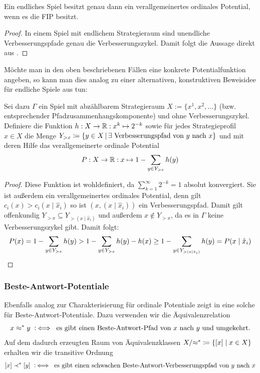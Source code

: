 \begin{kor}\label{kor:CharExVerOrdFIP}
	Ein endliches Spiel besitzt genau dann ein verallgemeinertes ordinales Potential, wenn es die FIP besitzt.
\end{kor}

\begin{proof}
	In einem Spiel mit endlichem Strategieraum sind unendliche Verbesserungspfade genau die Verbesserungszykel. Damit folgt die Aussage direkt aus .
\end{proof}

\begin{bem}
	Möchte man in den oben beschriebenen Fällen eine konkrete Potentialfunktion angeben, so kann man dies analog zu einer alternativen, konstruktiven Beweisidee für endliche Spiele aus \cite[Abschnitt 5]{CongGamesPlayerSpecPayoff} tun:

	Sei dazu $\Gamma$ ein Spiel mit abzählbarem Strategieraum $X := \{x^1, x^2, \dots \}$ (bzw. entsprechender Pfadzusammenhangskomponente) und ohne Verbesserungszykel. Definiere die Funktion $h: X \to \mathbb{R}: x^k \mapsto 2^{-k}$ sowie für jedes Strategieprofil $x \in X$ die Menge $Y_{>x} \coloneqq \left\{y \in X \,\middle|\, \exists \text{ Verbesserungspfad von } y \text{ nach } x\right\}$ und mit deren Hilfe das verallgemeinerte ordinale Potential
	\[P: X \to \mathbb{R}: x \mapsto 1 - \sum_{y \in Y_{>x}} h(y)\]
\end{bem}

\begin{proof}
	Diese Funktion ist wohldefiniert, da $\sum_{k=1}^{\infty} 2^{-k} = 1$ absolut konvergiert. Sie ist außerdem ein verallgemeinertes ordinales Potential, denn gilt $c_i(x) > c_i(x \mid \hat{x}_i)$ so ist $(x, (x \mid \hat{x}_i))$ ein Verbesserungspfad. Damit gilt offenkundig $Y_{>x} \subseteq Y_{>(x \mid \hat{x}_i)}$ und außerdem $x \notin Y_{>x}$, da es in $\Gamma$ keine Verbesserungszykel gibt. Damit folgt:
		\[P(x) = 1 - \sum_{y \in Y_{>x}} h(y) > 1 - \sum_{y \in Y_{>x}} h(y) - h(x) \geq 1 - \sum_{y \in Y_{>(x \mid \hat{x}_i)}}h(y) = P(x \mid \hat{x}_i)\qedhere\]
\end{proof}


\subsubsection{Beste-Antwort-Potentiale}

Ebenfalls analog zur Charakterisierung für ordinale Potentiale zeigt \citeauthor{BestRespPot} in \cite[Theorem 3.1]{BestRespPot} eine solche für Beste-Antwort-Potentiale. Dazu verwenden wir die Äquivalenzrelation
	\[x \approx^\ast y \mathbin{~\mathop:\!\!\iff} \text{ es gibt einen Beste-Antwort-Pfad von $x$ nach $y$ und umgekehrt}.\]
Auf dem dadurch erzeugten Raum von Äquivalenzklassen $X/{\approx^\ast} \coloneqq \left\lbrace[x] \mid x \in X\right\rbrace$ erhalten wir die transitive Ordnung
\[[x] \prec^\ast [y] \mathbin{~\mathop:\!\!\iff} \text{ es gibt einen schwachen Beste-Antwort-Verbesserungspfad von $y$ nach $x$}\]

